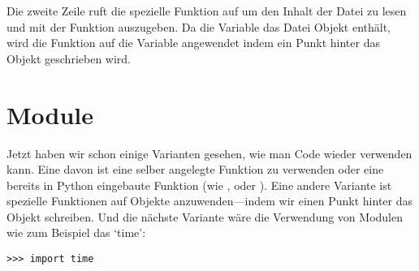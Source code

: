 \par
Die zweite Zeile ruft die spezielle Funktion  auf um den Inhalt der Datei zu lesen und mit der  Funktion auszugeben. Da die Variable  das Datei Objekt enthält, wird die  Funktion auf die  Variable angewendet indem ein Punkt hinter das Objekt geschrieben wird.


\section{Module}

Jetzt haben wir schon einige Varianten gesehen, wie man Code wieder verwenden kann. Eine davon ist eine selber angelegte Funktion zu verwenden oder eine bereits in Python eingebaute Funktion (wie ,  oder ). Eine andere Variante ist spezielle Funktionen auf Objekte anzuwenden---indem wir einen Punkt hinter das Objekt schreiben. Und die nächste Variante wäre die Verwendung von Modulen wie zum Beispiel das `time':

\begin{Verbatim}[frame=single]
>>> import time
\end{Verbatim}

